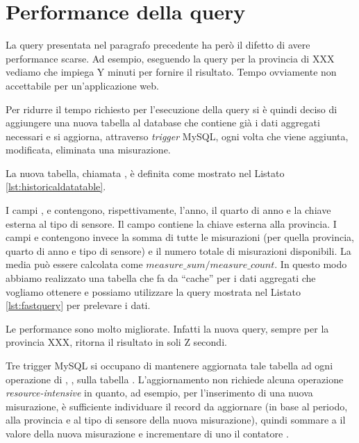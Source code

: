 \section{Performance della query}

La query presentata nel paragrafo precedente ha però il difetto di avere
performance scarse. Ad esempio, eseguendo la query per la provincia di XXX
vediamo che impiega Y minuti per fornire il risultato. Tempo ovviamente non
accettabile per un'applicazione web.

Per ridurre il tempo richiesto per l'esecuzione della query si è quindi deciso
di aggiungere una nuova tabella al database che contiene già i dati aggregati
necessari e si aggiorna, attraverso \textit{trigger} MySQL, ogni volta che viene
aggiunta, modificata, eliminata una misurazione.

La nuova tabella, chiamata , è definita come mostrato nel
Listato \vref{lst:historicaldatatable}.



I campi ,  e  contengono,
rispettivamente, l'anno, il quarto di anno e la chiave esterna al tipo di
sensore. Il campo  contiene la chiave esterna alla provincia. I
campi  e  contengono invece la somma di
tutte le misurazioni (per quella provincia, quarto di anno e tipo di sensore) e
il numero totale di misurazioni disponibili.  La media può essere calcolata come
\(measure\_sum / measure\_count\). In questo modo abbiamo realizzato una tabella
che fa da ``cache'' per i dati aggregati che vogliamo ottenere e possiamo
utilizzare la query mostrata nel Listato \vref{lst:fastquery} per prelevare i
dati.



Le performance sono molto migliorate. Infatti la nuova query, sempre per la
provincia XXX, ritorna il risultato in soli Z secondi.

Tre trigger MySQL si occupano di mantenere aggiornata tale tabella ad ogni
operazione di , ,  sulla tabella
. L'aggiornamento non richiede alcuna operazione
\textit{resource-intensive} in quanto, ad esempio, per l'inserimento di una nuova
misurazione, è sufficiente individuare il record da aggiornare (in base al
periodo, alla provincia e al tipo di sensore della nuova misurazione), quindi
sommare a  il valore della nuova misurazione e incrementare
di uno il contatore .

